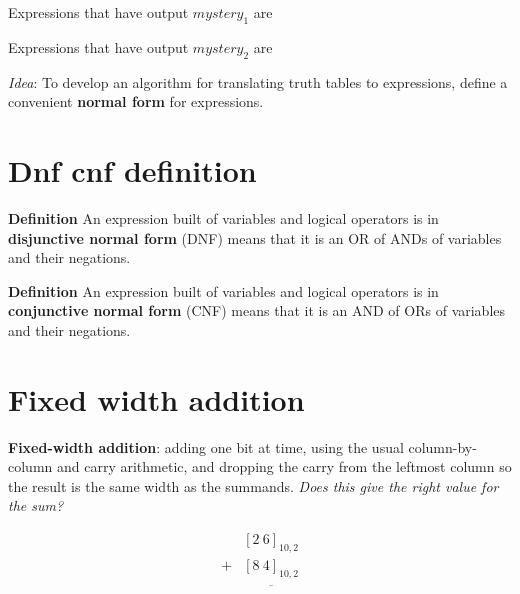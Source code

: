 \documentclass[12pt, oneside]{article}
\begin{document}
Expressions that have output $mystery_1$ are

\vspace{100pt}

Expressions that have output $mystery_2$ are

\vspace{100pt}

{\it Idea}: To develop an algorithm for translating truth tables to expressions, 
define a convenient {\bf normal form} for expressions. \vfill
\section*{Dnf cnf definition}


{\bf  Definition} An expression built of variables and logical 
operators is in {\bf disjunctive normal form}  (DNF) means
that it is an OR of ANDs of variables and their negations.

{\bf  Definition} An expression built of variables and logical 
operators is in {\bf conjunctive normal form}  (CNF) means
that it is an AND of ORs of variables and their negations.
 \vfill
\section*{Fixed width addition}


{\bf Fixed-width addition}: adding one bit at time, using the usual column-by-column and carry arithmetic, and dropping the carry from the leftmost column so the result is the same width as the summands.  {\it Does this give the right value for the sum?}


\begin{align*}
   & [2~ 6]_{10,2}\\
+ &  [8~ 4]_{10,2}\\
&\overline{\phantom{[0~0]_{10,2}}}\\
\end{align*}

\vfill
\end{document}
